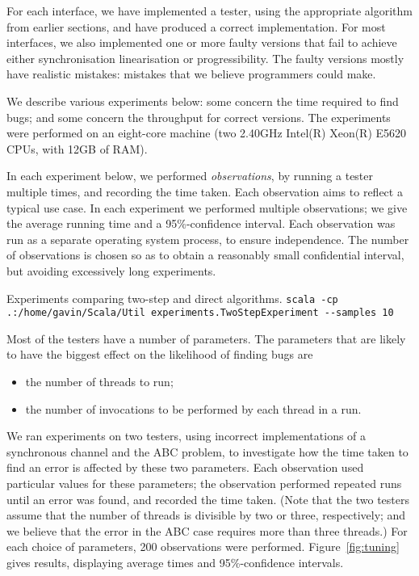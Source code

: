 For each interface, we have implemented a tester, using the appropriate
algorithm from earlier sections, and have produced a correct implementation.
For most interfaces, we also implemented one or more faulty versions that fail
to achieve either synchronisation linearisation or progressibility.  The
faulty versions mostly have realistic mistakes: mistakes that we believe
programmers could make.

We describe various experiments below: some concern the time required to find
bugs; and some concern the throughput for correct versions.
%
The experiments were performed on an eight-core machine (two 2.40GHz Intel(R)
Xeon(R) E5620 CPUs, with 12GB of RAM).

In each experiment below, we performed \emph{observations}, by running a
tester multiple times, and recording the time taken.  Each observation aims to
reflect a typical use case.  In each experiment we performed multiple
observations; we give the average running time and a 95\%-confidence interval.
Each observation was run as a separate operating system process, to ensure
independence.  The number of observations is chosen so as to obtain a
reasonably small confidential interval, but avoiding excessively long
experiments.


  Experiments comparing two-step and direct algorithms.  
\verb!scala -cp .:/home/gavin/Scala/Util experiments.TwoStepExperiment --samples 10!




Most of the testers have a number of parameters.  The parameters that are
likely to have the biggest effect on the likelihood of finding bugs are
%
\begin{itemize}
\item the number of threads to run;
\item the number of invocations to be performed by each thread in a run.
\end{itemize}
%
We ran experiments on two testers, using incorrect implementations of a
synchronous channel and the ABC problem, to investigate how the time taken to
find an error is affected by these two parameters.  Each observation used
particular values for these parameters; the observation performed repeated
runs until an error was found, and recorded the time taken.  (Note that the
two testers assume that the number of threads is divisible by two or three,
respectively; and we believe that the error in the ABC case requires more than
three threads.)  For each choice of parameters, 200 observations were
performed.  Figure~\ref{fig:tuning} gives results, displaying average times
and 95\%-confidence intervals.

